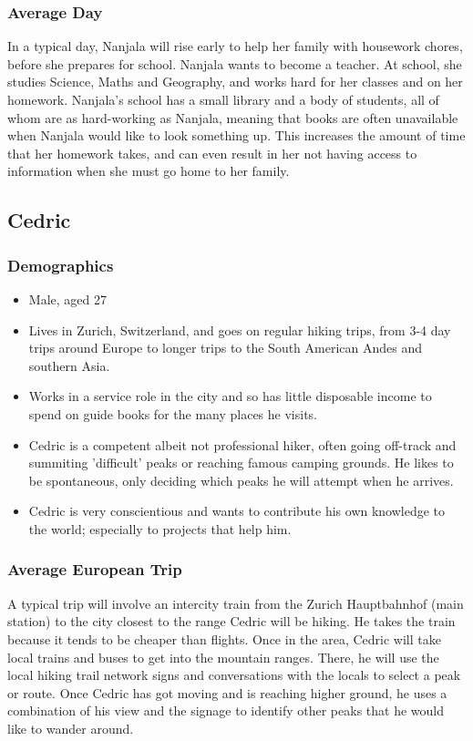 \documentclass{article}
\begin{document}
\subsubsection{Average Day}
In a typical day, Nanjala will rise early to help her family with housework chores, before she prepares for school.  Nanjala wants to become a teacher.  At school, she studies Science, Maths and Geography, and works hard for her classes and on her homework.  Nanjala's school has a small library and a body of students, all of whom are as hard-working as Nanjala, meaning that books are often unavailable when Nanjala would like to look something up.  This increases the amount of time that her homework takes, and can even result in her not having access to information when she must go home to her family.

\newpage
\subsection{Cedric}
\subsubsection{Demographics}
\begin{itemize}
  \item Male, aged 27
  \item Lives in Zurich, Switzerland, and goes on regular hiking trips, from 3-4 day trips around Europe to longer trips to the South American Andes and southern Asia.
  \item Works in a service role in the city and so has little disposable income to spend on guide books for the many places he visits.
  \item Cedric is a competent albeit not professional hiker, often going off-track and summiting 'difficult' peaks or reaching famous camping grounds.  He likes to be spontaneous, only deciding which peaks he will attempt when he arrives.
  \item Cedric is very conscientious and wants to contribute his own knowledge to the world; especially to projects that help him.
\end{itemize}
\subsubsection{Average European Trip}
A typical trip will involve an intercity train from the Zurich Hauptbahnhof (main station) to the city closest to the range Cedric will be hiking.  He takes the train because it tends to be cheaper than flights.  Once in the area, Cedric will take local trains and buses to get into the mountain ranges.  There, he will use the local hiking trail network signs and conversations with the locals to select a peak or route.  Once Cedric has got moving and is reaching higher ground, he uses a combination of his view and the signage to identify other peaks that he would like to wander around.  
\end{document}

